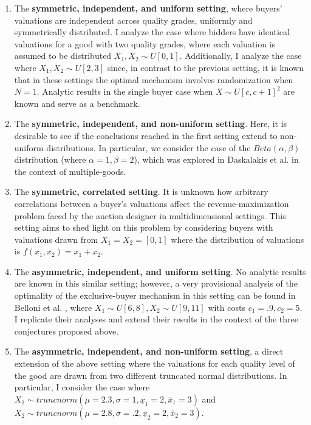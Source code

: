 \begin{enumerate}
    \item The \textbf{symmetric, independent, and uniform setting}, where buyers' valuations are independent across quality grades, uniformly and symmetrically distributed. I analyze the case where bidders have identical valuations for a good with two quality grades, where each valuation is assumed to be distributed $X_1,X_2 \sim U[0,1]$. Additionally, I analyze the case where $X_1,X_2 \sim U[2,3]$ since, in contrast to the previous setting, it is known that in these settings the optimal mechanism involves randomization when $N=1$. Analytic results in the single buyer case when $X \sim U[c,c+1]^2$ are known \autocite{pavlov2011optimal} and serve as a benchmark.

    \item The \textbf{symmetric, independent, and non-uniform setting}. Here, it is desirable to see if the conclusions reached in the first setting extend to non-uniform distributions. In particular, we consider the case of the $Beta(\alpha,\beta)$ distribution (where $\alpha=1,\beta=2$), which was explored in Daskalakis et al. \autocite*{daskalakis2017strong} in the context of multiple-goods.  

    \item The \textbf{symmetric, correlated setting}. It is unknown how arbitrary correlations between a buyer's valuations affect the revenue-maximization problem faced by the auction designer in multidimensional settings. This setting aims to shed light on this problem by considering buyers with valuations drawn from $X_1 = X_2 = [0,1]$ where the distribution of valuations is $f(x_1,x_2) = x_1 + x_2$.

    \item The \textbf{asymmetric, independent, and uniform setting}. No analytic results are known in this similar setting; however, a very provisional analysis of the optimality of the exclusive-buyer mechanism in this setting can be found in Belloni et al. \autocite*{belloni2010multidimensional}, where $X_1 \sim U[6,8], X_2 \sim U[9,11]$ with costs $c_1 = .9, c_2 = 5$. I replicate their analyses and extend their results in the context of the three conjectures proposed above.

    \item The \textbf{asymmetric, independent, and non-uniform setting}, a direct extension of the above setting where the valuations for each quality level of the good are drawn from two different truncated normal distributions. In particular, I consider the case where $X_1 \sim truncnorm(\mu=2.3, \sigma=1, \underline{x}_1=2, \overline{x}_1=3)$ and $X_2 \sim truncnorm(\mu=2.8, \sigma=.2, \underline{x}_2=2, \overline{x}_2=3)$.
\end{enumerate}





